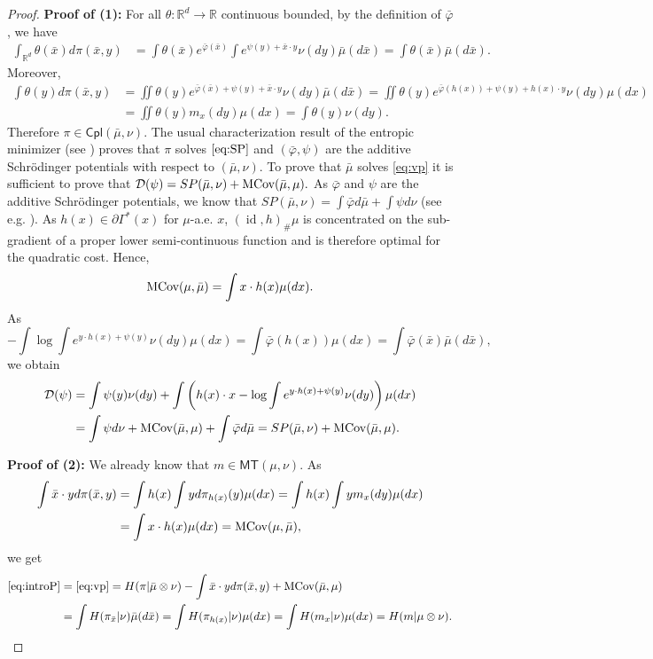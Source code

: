 \documentclass[reqno, a4paper]{amsart}
\DeclareMathOperator{\id}{id}
\theoremstyle{plain}
\theoremstyle{definition}
\theoremstyle{remark}
\numberwithin{equation}{section}
\numberwithin{theorem}{section}
\newcommand{\R}{\mathbb{R}}
\newcommand{\MT}{\mathsf{MT}}
\newcommand{\Cpl}{\mathsf{Cpl}}
\newcommand{\MCov}{\textnormal{MCov}}
\begin{document}
\begin{proof}
		\noindent\textbf{Proof of (1):} For all $\theta :\R^d \to \R$ continuous bounded, by the definition of $\bar\varphi$, we have 
		\begin{align*} 
			\int_{\R^d} \theta(\bar x) d\pi(\bar x,y) &= \int \theta(\bar x)  e^{\bar\varphi(\bar  x)} \int e^{\psi(y)+\bar x \cdot y} \nu(dy) \bar\mu(d \bar x)= \int \theta(\bar x) \bar{\mu}(d \bar x).
		\end{align*}
		Moreover,
		\begin{align*}
			\int \theta(y) d\pi(\bar x,y) &= \iint  \theta(y) e^{\bar\varphi(\bar x)+\psi(y)+\bar x \cdot y} \nu(dy) \bar\mu(d\bar x) = \iint  \theta(y) e^{\bar\varphi(h(x))+\psi(y)+h(x) \cdot y} \nu(dy) \mu(dx) \\
			&= \iint \theta(y) m_x(dy) \mu(dx) = \int \theta(y) \nu(dy). 
		\end{align*}
		Therefore $\pi \in \Cpl(\bar \mu,\nu)$. The usual characterization result of the entropic minimizer (see \cite[Theorem 4.2, b)]{Nu22}) proves that $\pi$ solves $\eqref{eq:SP}$ and $(\bar\varphi,\psi)$ are the additive Schrödinger potentials with respect to $(\bar \mu,\nu)$. To prove that $\bar \mu$ solves \eqref{eq:vp} it is sufficient to prove that $\mathcal{D}(\psi) = SP(\bar \mu,\nu) + \MCov(\bar \mu ,\mu).$ As $\bar\varphi$ and $\psi$ are the additive Schrödinger potentials, we know that $SP(\bar \mu,\nu) = \int \bar\varphi d\bar \mu + \int \psi d \nu$ (see e.g. \cite[Theorem 4.7]{Nu22}).
		As  $h(x) \in \partial \Gamma^*(x)$ for $\mu$-a.e. $x$, $(\id,h)_\# \mu$ is concentrated on the sub-gradient of a proper lower semi-continuous function and is therefore optimal for the quadratic cost. Hence, $$\MCov(\mu,\bar \mu) = \int x \cdot h(x) \mu(dx).$$ As $$- \int \log \int e^{y \cdot h(x) + \psi(y)} \nu(dy) \mu(dx) = \int \bar\varphi(h(x)) \mu(dx) = \int \bar\varphi(\bar x)  \bar \mu(d\bar x),$$ we obtain
		\begin{align*}
			\mathcal{D}(\psi) &= \int \psi(y) \nu(dy) + \int \left( h(x) \cdot x - \log \int e^{y \cdot h(x) + \psi(y)} \nu(dy) \right) \mu(dx)\\
			&=\int \psi d\nu + \MCov(\bar \mu ,\mu) + \int \bar\varphi d\bar \mu = SP(\bar \mu,\nu) + \MCov(\bar \mu,\mu).
		\end{align*}
		\vspace{0.5cm}
		
		\noindent\textbf{Proof of (2):} We already know that $m \in \MT(\mu,\nu)$. As 
		\begin{align*}
			\int \bar x\cdot y d\pi(\bar x,y) &= \int h(x) \int y d\pi_{h(x)}(y) \mu(dx) = \int h(x) \int y m_x(dy) \mu(dx)\\ &= \int x \cdot h(x) \mu(dx) = \MCov(\mu,\bar \mu),
		\end{align*}
		we get
		\begin{align*}
			\eqref{eq:introP} &=\eqref{eq:vp} = H(\pi|\bar \mu \otimes \nu) - \int \bar x \cdot y d \pi(\bar x,y) + \MCov(\bar \mu, \mu)\\ 
			&= \int H(\pi_{\bar x}| \nu) \bar \mu (d \bar x)
			= \int H(\pi_{h(x)}|\nu) \mu(dx) = \int H(m_x|\nu) \mu(dx)
			=H(m|\mu \otimes \nu).\qedhere
		\end{align*}
	\end{proof}
	
\end{document}
